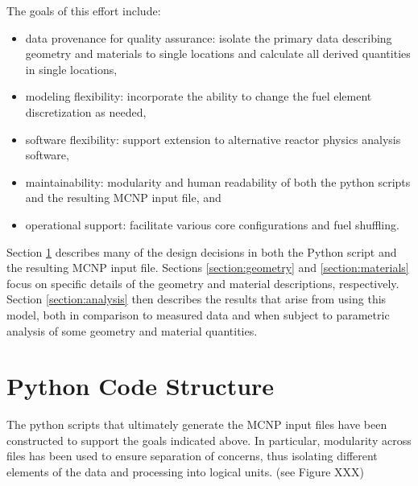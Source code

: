 \documentclass{UWNR_modeling}
\begin{document}
The goals of this effort include:
\begin{itemize}
\item data provenance for quality assurance: isolate the primary data describing geometry and materials to single locations and calculate all derived quantities in single locations,
\item modeling flexibility: incorporate the ability to change the fuel element discretization as needed,
\item software flexibility: support extension to alternative reactor physics analysis software,
\item maintainability: modularity and human readability of both the python scripts and the resulting MCNP input file, and
\item operational support: facilitate various core configurations and fuel shuffling.
\end{itemize}

Section \ref{section:code_struct} describes many of the design decisions in both the Python script and the resulting MCNP input file.  Sections \ref{section:geometry} and \ref{section:materials} focus on specific details of the geometry and material descriptions, respectively.  Section \ref{section:analysis} then describes the results that arise from using this model, both in comparison to measured data and when subject to parametric analysis of some geometry and material quantities.

\section{Python Code Structure}\label{section:code_struct}

The python scripts that ultimately generate the MCNP input files have been
constructed to support the goals indicated above.  In particular, modularity
across files has been used to ensure separation of concerns, thus isolating
different elements of the data and processing into logical units.  (see Figure
XXX)
\end{document}
